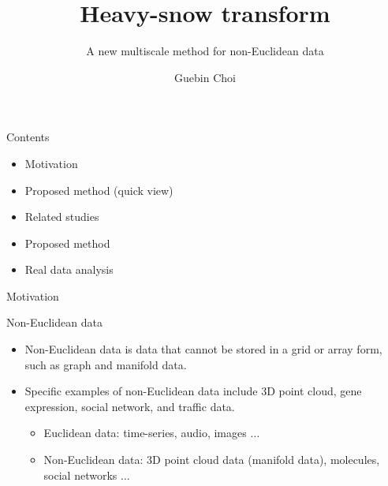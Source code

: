 \documentclass[
  ignorenonframetext,
]{beamer}
\title{Heavy-snow transform}
\subtitle{A new multiscale method for non-Euclidean data}
\author{Guebin Choi}
\date{}
\providecommand{\tightlist}{%
  \setlength{\itemsep}{0pt}\setlength{\parskip}{0pt}}\usepackage{longtable,booktabs,array}
\begin{document}
\frame{\titlepage}

\begin{frame}{Contents}
\label{contents}
\begin{itemize}
\item
  Motivation
\item
  Proposed method (quick view)
\item
  Related studies
\item
  Proposed method
\item
  Real data analysis
\end{itemize}
\end{frame}

\begin{frame}{Motivation}
\label{motivation}
\begin{block}{Non-Euclidean data}
\label{non-euclidean-data}
\begin{itemize}
\item
  Non-Euclidean data is data that cannot be stored in a grid or array
  form, such as graph and manifold data.
\item
  Specific examples of non-Euclidean data include 3D point cloud, gene
  expression, social network, and traffic data.

  \begin{itemize}
  \tightlist
  \item
    Euclidean data: time-series, audio, images \(\dots\)
  \item
    Non-Euclidean data: 3D point cloud data (manifold data), molecules,
    social networks \(\dots\)
  \end{itemize}
\end{itemize}
\end{block}
\end{frame}
\end{document}
